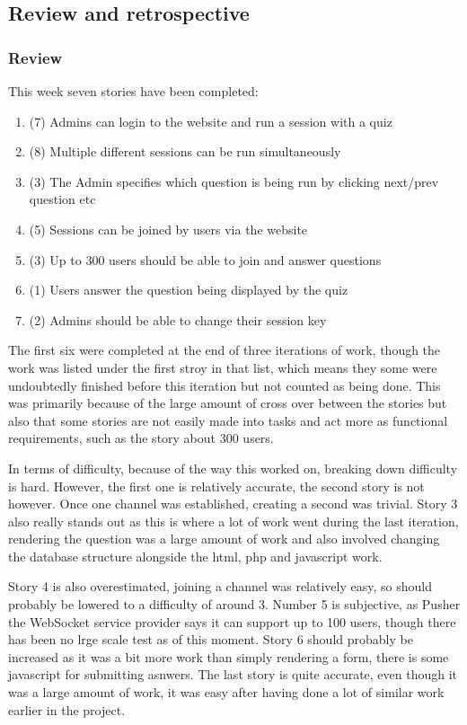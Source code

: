 \subsection{Review and retrospective}
\subsubsection{Review}
This week seven stories have been completed:
\begin{enumerate}
	\item (7) Admins can login to the website and run a session with a quiz
	\item (8) Multiple different sessions can be run simultaneously
	\item (3) The Admin specifies which question is being run by clicking next/prev question etc
	\item (5) Sessions can be joined by users via the website
	\item (3) Up to 300 users should be able to join and answer questions
	\item (1) Users answer the question being displayed by the quiz
	\item (2) Admins should be able to change their session key
\end{enumerate}
The first six were completed at the end of three iterations of work, though the work was listed under the first stroy in that list, which means they some were undoubtedly finished before this iteration but not counted as being done. This was primarily because of the large amount of cross over between the stories but also that some stories are not easily made into tasks and act more as functional requirements, such as the story about 300 users.

In terms of difficulty, because of the way this worked on, breaking down difficulty is hard. However, the first one is relatively accurate, the second story  is not however. Once one channel was established, creating a second was trivial. Story 3 also really stands out as this is where a lot of work went during the last iteration, rendering the question was a large amount of work and also involved changing the database structure alongside the html, php and javascript work. 

Story 4 is also overestimated, joining a channel was relatively easy, so should probably be lowered to a difficulty of around 3. Number 5 is subjective, as Pusher the WebSocket service provider says it can support up to 100 users, though there has been no lrge scale test as of this moment. Story 6 should probably be increased as it was a bit more work than simply rendering a form, there is some javascript for submitting asnwers. The last story is quite accurate, even though it was a large amount of work, it was easy after having done a lot of similar work earlier in the project.

